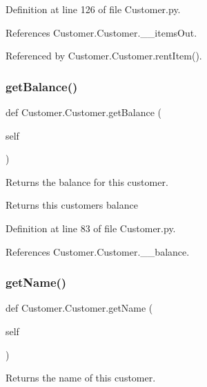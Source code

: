 Definition at line 126 of file Customer.\+py.



References Customer.\+Customer.\+\_\+\+\_\+items\+Out.



Referenced by Customer.\+Customer.\+rent\+Item().

\mbox{\label{classCustomer_1_1Customer_aebb56585524424bcededa48f90a2dde6}} 
\subsubsection{\texorpdfstring{get\+Balance()}{getBalance()}}
{\footnotesize\ttfamily def Customer.\+Customer.\+get\+Balance (\begin{DoxyParamCaption}\item[{}]{self }\end{DoxyParamCaption})}



Returns the balance for this customer. 

\begin{DoxyReturn}{Returns}
this customer\textquotesingle{}s balance 
\end{DoxyReturn}


Definition at line 83 of file Customer.\+py.



References Customer.\+Customer.\+\_\+\+\_\+balance.

\mbox{\label{classCustomer_1_1Customer_a154e1dbfb02e85d29b52e620b6283677}} 
\subsubsection{\texorpdfstring{get\+Name()}{getName()}}
{\footnotesize\ttfamily def Customer.\+Customer.\+get\+Name (\begin{DoxyParamCaption}\item[{}]{self }\end{DoxyParamCaption})}



Returns the name of this customer. 

